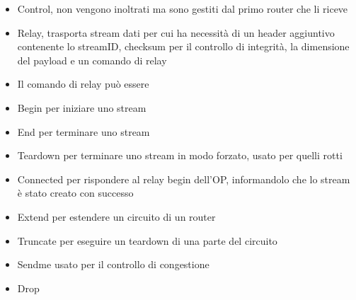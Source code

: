 \begin{itemize}
    \item Control, non vengono inoltrati ma sono gestiti dal primo router che li riceve
    \item Relay, trasporta stream dati per cui ha necessità di un header aggiuntivo contenente lo streamID, checksum per il controllo di integrità, la dimensione del payload e un comando di relay
    \item Il comando di relay può essere 
    \item Begin per iniziare uno stream
    \item End per terminare uno stream
    \item Teardown per terminare uno stream in modo forzato, usato per quelli rotti
    \item Connected per rispondere al relay begin dell'OP, informandolo che lo stream è stato creato con successo
    \item Extend per estendere un circuito di un router 
    \item Truncate per eseguire un teardown di una parte del circuito
    \item Sendme usato per il controllo di congestione
    \item Drop 
\end{itemize}


